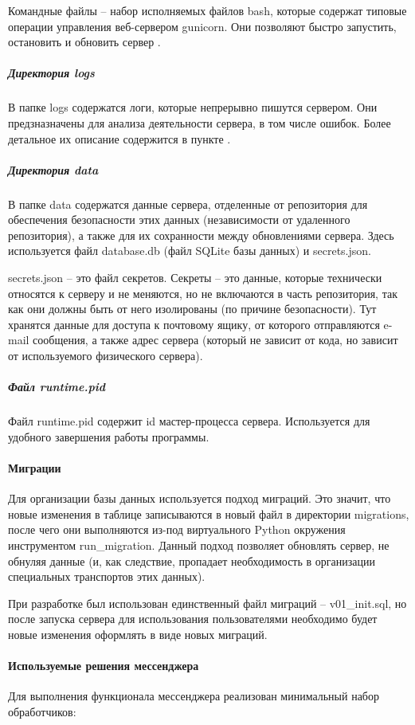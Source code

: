 \documentclass[explnote]{espd}
\begin{document}
Командные файлы -- набор исполняемых файлов bash, которые содержат типовые операции управления веб-сервером gunicorn. Они позволяют быстро запустить, остановить и обновить сервер .

\subparagraph{Директория logs}
В папке logs содержатся логи, которые непрерывно пишутся сервером. Они предзназначены для анализа деятельности сервера, в том числе ошибок. Более детальное их описание содержится в пункте \label{paragraph:output}.

\subparagraph{Директория data}
В папке data содержатся данные сервера, отделенные от репозитория для обеспечения безопасности этих данных (независимости от удаленного репозитория), а также для их сохранности между обновлениями сервера. Здесь используется файл database.db (файл SQLite базы данных) и secrets.json.

secrets.json -- это файл секретов. Секреты -- это данные, которые технически относятся к серверу и не меняются, но не включаются в часть репозитория, так как они должны быть от него изолированы (по причине безопасности). Тут хранятся данные для доступа к почтовому ящику, от которого отправляются e-mail сообщения, а также адрес сервера (который не зависит от кода, но зависит от используемого физического сервера).

\subparagraph{Файл runtime.pid}
Файл runtime.pid содержит id мастер-процесса сервера. Используется для удобного завершения работы программы.

\paragraph{Миграции}
Для организации базы данных используется подход миграций. Это значит, что новые изменения в таблице записываются в новый файл в директории migrations, после чего они выполняются из-под виртуального Python окружения инструментом run\_migration. Данный подход позволяет обновлять сервер, не обнуляя данные (и, как следствие, пропадает необходимость в организации специальных транспортов этих данных).

При разработке был использован единственный файл миграций -- v01\_init.sql, но после запуска сервера для использования пользователями необходимо будет новые изменения оформлять в виде новых миграций.

\paragraph{Используемые решения мессенджера}
Для выполнения функционала мессенджера реализован минимальный набор обработчиков:
\end{document}

